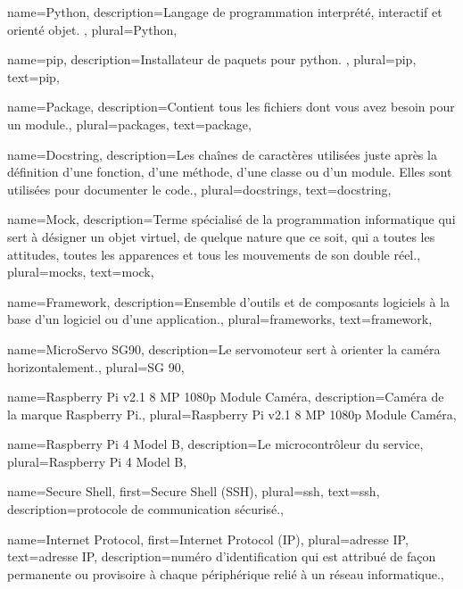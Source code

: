 {
    name={Python},
    description={Langage de programmation interprété, interactif et orienté objet. \cite{python}},
    plural={Python},
}

{
    name={pip},
    description={Installateur de \glspl{paquet} pour \gls{python}. \cite{pip}},
    plural={pip},
    text={pip},
}

{
    name={Package},
    description={Contient tous les fichiers dont vous avez besoin pour un module.},
    plural={packages},
    text={package},
}

{
    name={Docstring},
    description={Les chaînes de caractères utilisées juste après la définition d'une fonction, d'une méthode, d'une
            classe ou d'un module. Elles sont utilisées pour documenter le code.},
    plural={docstrings},
    text={docstring},
}

{
    name={Mock},
    description={Terme spécialisé de la programmation informatique qui sert à désigner un objet virtuel, de quelque
            nature que ce soit, qui a toutes les attitudes, toutes les apparences et tous les mouvements de son double
            réel.},
    plural={mocks},
    text={mock},
}

{
    name={Framework},
    description={Ensemble d'outils et de composants logiciels à la base d'un logiciel ou d'une application.},
    plural={frameworks},
    text={framework},
}

{
    name={MicroServo SG90},
    description={Le servomoteur sert à orienter la caméra horizontalement.},
    plural={SG 90},
}

{
    name={Raspberry Pi v2.1 8 MP 1080p Module Caméra},
    description={Caméra de la marque Raspberry Pi.},
    plural={Raspberry Pi v2.1 8 MP 1080p Module Caméra},
}

{
    name={Raspberry Pi 4 Model B},
    description={Le microcontrôleur du service},
    plural={Raspberry Pi 4 Model B},
}

{
    name={Secure Shell},
    first={Secure Shell (SSH)},
    plural={ssh},
    text={ssh},
    description={protocole de communication sécurisé.},
}

{
    name={Internet Protocol},
    first={Internet Protocol (IP)},
    plural={adresse IP},
    text={adresse IP},
    description={numéro d'identification qui est attribué de façon permanente ou provisoire à chaque périphérique relié
            à un réseau informatique.},
}